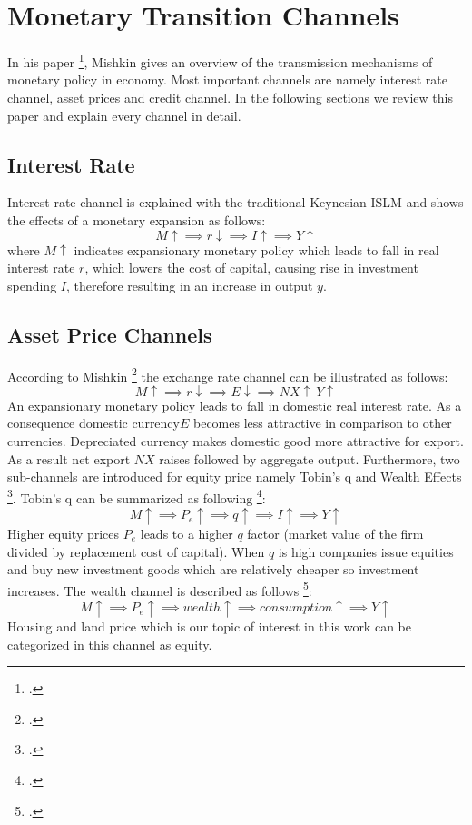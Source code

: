 \newpage
\section{Monetary Transition Channels} \label{sec:MonetaryTransitionChannels}
In his paper \footcite[See.][]{Mishkin1996}, Mishkin gives an overview of the transmission mechanisms of monetary policy in economy. Most important channels are namely interest rate channel, asset prices and credit channel. In the following sections we review this paper and explain every channel in detail. 

\subsection{Interest Rate}
Interest rate channel is explained with the traditional Keynesian \ac{ISLM} and shows the effects of a monetary expansion as follows:
  \[M \uparrow \implies r \downarrow \implies I \uparrow \implies Y \uparrow\]
where $ M \uparrow $ indicates expansionary monetary policy which leads to fall in real interest rate $r$, which lowers the cost of capital, causing rise in investment spending $I$, therefore resulting in an increase in output $y$.

\subsection{Asset Price Channels}
According to Mishkin \footcite[See.][]{Mishkin1996} the exchange rate channel can be illustrated as follows:
 \[M \uparrow \implies r \downarrow \implies E \downarrow \implies NX \uparrow\ Y \uparrow\]
An expansionary monetary policy leads to fall in domestic real interest rate. As a consequence domestic currency$E$  becomes less attractive in comparison to other currencies. Depreciated currency makes domestic good more attractive for export. As a result net export $NX$ raises followed by aggregate output. 
Furthermore,  two sub-channels are introduced for equity price namely Tobin's q and Wealth Effects \footcite[See.][]{Mishkin1996}. 
Tobin's q can be summarized as following \footcite[See.][]{Mishkin1996}: 
 \[M \uparrow \implies P_e \uparrow \implies q \uparrow \implies I \uparrow \implies Y \uparrow\]
Higher equity prices $P_e$ leads to a higher $q$ factor (market value of the firm divided by replacement cost of capital). When $q$ is high companies issue equities and buy new investment goods which are relatively cheaper so investment increases. 
The wealth channel is described as follows \footcite[See.][]{Mishkin1996}: 
\[M \uparrow \implies P_e \uparrow \implies wealth \uparrow \implies consumption \uparrow \implies Y \uparrow\]
Housing and land price which is our topic of interest in this work can be categorized in this channel as equity.

